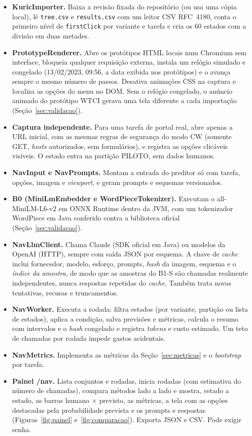 \documentclass[12pt,oneside,a4paper,chapter=TITLE,english,brazil]{abntex2}
\newcommand{\code}[1]{\texttt{#1}}
\begin{document}
\begin{itemize}
\item \textbf{KuricImporter.} Baixa a revisão fixada do repositório (ou usa uma cópia local), lê \code{tree.csv} e \code{results.csv} com um leitor CSV RFC~4180, conta o primeiro nível de \code{firstClick} por variante e tarefa e cria os 60 estados com a divisão em duas metades.
\item \textbf{PrototypeRenderer.} Abre os protótipos HTML locais num Chromium sem interface, bloqueia qualquer requisição externa, instala um relógio simulado e congelado (13/02/2023, 09:56, a data exibida nos protótipos) e o avança sempre o mesmo número de passos. Desativa animações CSS na captura e localiza as opções do menu no DOM. Sem o relógio congelado, o anúncio animado do protótipo WTCI gerava uma tela diferente a cada importação (Seção~\ref{sec:validacao}).
\item \textbf{Captura independente.} Para uma tarefa de portal real, abre apenas a URL inicial, com as mesmas regras de segurança do modo CW (somente GET, \textit{hosts} autorizados, sem formulários), e registra as opções clicáveis visíveis. O estado entra na partição PILOTO, sem dados humanos.
\item \textbf{NavInput e NavPrompts.} Montam a entrada do preditor só com tarefa, opções, imagem e \textit{viewport}, e geram prompts e esquemas versionados.
\item \textbf{B0 (MiniLmEmbedder e WordPieceTokenizer).} Executam o all-MiniLM-L6-v2 em ONNX Runtime dentro da JVM, com um tokenizador WordPiece em Java conferido contra a biblioteca oficial (Seção~\ref{sec:validacao}).
\item \textbf{NavLlmClient.} Chama Claude (SDK oficial em Java) ou modelos da OpenAI (HTTP), sempre com saída JSON por esquema. A chave de \textit{cache} inclui fornecedor, modelo, esforço, prompts, \textit{hash} da imagem, esquema e o \emph{índice da amostra}, de modo que as amostras do B1-S são chamadas realmente independentes, nunca respostas repetidas do \textit{cache}. Também trata novas tentativas, recusas e truncamentos.
\item \textbf{NavWorker.} Executa a rodada: filtra estados (por variante, partição ou lista de estados), aplica a condição, salva previsões e métricas, calcula o resumo com intervalos e o \textit{hash} congelado e registra \textit{tokens} e custo estimado. Um teto de chamadas por rodada impede gastos acidentais.
\item \textbf{NavMetrics.} Implementa as métricas da Seção~\ref{sec:metricas} e o \textit{bootstrap} por tarefa.
\item \textbf{Painel /nav.} Lista conjuntos e rodadas, inicia rodadas (com estimativa do número de chamadas), compara métodos lado a lado e mostra, estado a estado, as barras humano $\times$ previsto, as métricas, a tela com as opções destacadas pela probabilidade prevista e os prompts e respostas (Figuras~\ref{fig:painel} e~\ref{fig:comparacao}). Exporta JSON e CSV. Pode exigir senha.
\end{itemize}
\end{document}
